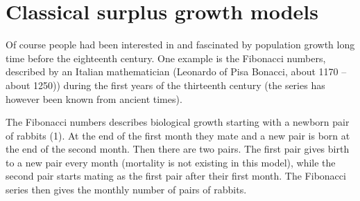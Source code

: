 \documentclass[11pt,fleqn]{book} %
\begin{document}
\section{Classical surplus growth models}\label{section:surplus production}

Of course people had been interested in and fascinated by population growth long time before the eighteenth century. One example is the Fibonacci numbers, described by an Italian mathematician (Leonardo of Pisa Bonacci, about 1170 – about 1250)) during the first years of the thirteenth century (the series has however been known from ancient times). 

The Fibonacci numbers describes biological growth starting with a newborn pair of rabbits (1). At the end of the first month they mate and a new pair is born at the end of the second month. Then there are two pairs. The first pair gives birth to a new pair every month (mortality is not existing in this model), while the second pair starts mating as the first pair after their first month. The Fibonacci series then gives the monthly number of pairs of rabbits.
\end{document}
